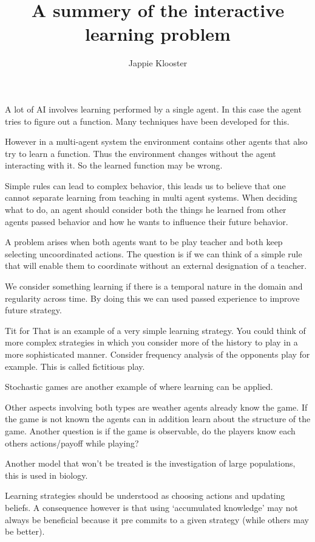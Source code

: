\documentclass{article}
\begin{document}
\author{Jappie Klooster}
\title{A summery of the interactive learning problem}

\maketitle

A lot of AI involves learning performed by a single agent. In this case the
agent tries to figure out a function. Many techniques have been
developed for this.

However in a multi-agent system the environment contains other
agents that also try to learn a function. Thus the environment
changes without the agent interacting with it. So the learned
function may be wrong.

Simple rules can lead to complex behavior, this leads us to believe
that one cannot separate learning from teaching in multi agent systems.
When deciding what to do, an agent should consider both the things he
learned from other agents passed behavior and how he wants to
influence their future behavior.

A problem arises when both agents want to be play teacher and
both keep selecting uncoordinated actions. The question is if
we can think of a simple rule that will enable them
to coordinate without an external designation of a teacher.

We consider something learning if there is a temporal nature in the domain
and regularity across time. By doing this we can used
passed experience to improve future strategy.

Tit for That is an example of a very simple learning strategy.
You could think of more complex strategies in which you consider
more of the history to play in a more sophisticated manner.
Consider frequency analysis of the opponents play for example.
This is called fictitious play.

Stochastic games are another example of where learning can be
applied.

Other aspects involving both types are weather agents already
know the game. If the game is not known the agents can in
addition learn about the structure of the game.
Another question is if the game is observable, do the
players know each others actions/payoff while playing?

Another model that won't be treated is the investigation
of large populations, this is used in biology.

Learning strategies should be understood as choosing actions
and updating beliefs. A consequence however is that
using `accumulated knowledge' may not always be beneficial
because it pre commits to a given strategy (while others may
be better).
\end{document}
